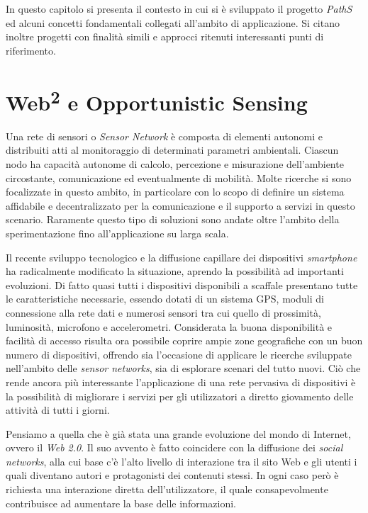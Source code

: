 In questo capitolo si presenta il contesto in cui si è sviluppato il progetto \emph{PathS} ed alcuni concetti fondamentali collegati all'ambito di applicazione. Si citano inoltre progetti con finalità simili e approcci ritenuti interessanti punti di riferimento.

\section{Web\textsuperscript{2} e Opportunistic Sensing}
Una rete di sensori o \emph{Sensor Network} è composta di elementi autonomi e distribuiti atti al monitoraggio di determinati parametri ambientali. Ciascun nodo ha capacità autonome di calcolo, percezione e misurazione dell'ambiente circostante, comunicazione ed eventualmente di mobilità. Molte ricerche si sono focalizzate in questo ambito, in particolare con lo scopo di definire un sistema affidabile e decentralizzato per la comunicazione e il supporto a servizi in questo scenario. Raramente questo tipo di soluzioni sono andate oltre l'ambito della sperimentazione fino all'applicazione su larga scala. 

Il recente sviluppo tecnologico e la diffusione capillare dei dispositivi \emph{smartphone} ha radicalmente modificato la situazione, aprendo la possibilità ad importanti evoluzioni. Di fatto quasi tutti i dispositivi disponibili a scaffale presentano tutte le caratteristiche necessarie, essendo dotati di un sistema GPS, moduli di connessione alla rete dati e numerosi sensori tra cui quello di prossimità, luminosità, microfono e accelerometri. Considerata la buona disponibilità e facilità di accesso risulta ora possibile coprire ampie zone geografiche con un buon numero di dispositivi, offrendo sia l'occasione di applicare le ricerche sviluppate nell'ambito delle \emph{sensor networks}, sia di esplorare scenari del tutto nuovi. Ciò che rende ancora più interessante l'applicazione di una rete pervasiva di dispositivi è la possibilità di migliorare i servizi per gli utilizzatori a diretto giovamento delle attività di tutti i giorni.

Pensiamo a quella che è già stata una grande evoluzione del mondo di Internet, ovvero il \emph{Web 2.0}. Il suo avvento è fatto coincidere con la diffusione dei \emph{social networks}, alla cui base c'è l'alto livello di interazione tra il sito Web e gli utenti i quali diventano autori e protagonisti dei contenuti stessi. In ogni caso però è richiesta una interazione diretta dell'utilizzatore, il quale consapevolmente contribuisce ad aumentare la base delle informazioni. 


